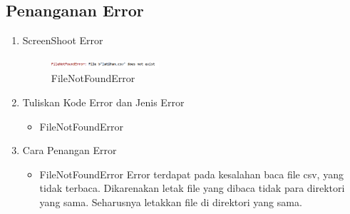 \subsection{Penanganan Error}
\begin{enumerate}
	\item ScreenShoot Error
	\begin{figure}[H]
		\includegraphics[width=4cm]{figures/1164013/err/eror.PNG}
		\centering
		\caption{FileNotFoundError}
	\end{figure}
	\item Tuliskan Kode Error dan Jenis Error
	\begin{itemize}
		\item FileNotFoundError
	\end{itemize}
	\item Cara Penangan Error
	\begin{itemize}
		\item FileNotFoundError
		\hfill\break
		Error terdapat pada kesalahan baca file csv, yang tidak terbaca. Dikarenakan letak file yang dibaca tidak para direktori yang sama. Seharusnya letakkan file di direktori yang sama. 
	\end{itemize}
\end{enumerate}
